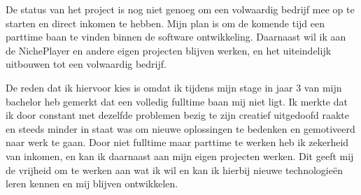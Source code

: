 De status van het project is nog niet genoeg om een volwaardig bedrijf mee op te starten en direct inkomen te hebben. Mijn plan is om de komende tijd een parttime baan te vinden binnen de software ontwikkeling. Daarnaast wil ik aan de NichePlayer en andere eigen projecten blijven werken, en het uiteindelijk uitbouwen tot een volwaardig bedrijf.

De reden dat ik hiervoor kies is omdat ik tijdens mijn stage in jaar 3 van mijn bachelor heb gemerkt dat een volledig fulltime baan mij niet ligt. Ik merkte dat ik door constant met dezelfde problemen bezig te zijn creatief uitgedoofd raakte en steeds minder in staat was om nieuwe oplossingen te bedenken en gemotiveerd naar werk te gaan. Door niet fulltime maar parttime te werken heb ik zekerheid van inkomen, en kan ik daarnaast aan mijn eigen projecten werken. Dit geeft mij de vrijheid om te werken aan wat ik wil en kan ik hierbij nieuwe technologieën leren kennen en mij blijven ontwikkelen.

